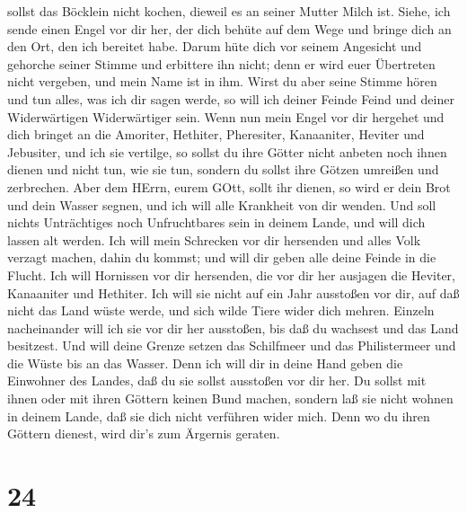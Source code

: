 sollst das Böcklein nicht kochen, dieweil es an seiner Mutter Milch ist.
 Siehe, ich sende einen Engel vor dir her, der dich behüte
auf dem Wege und bringe dich an den Ort, den ich bereitet habe.
 Darum hüte dich vor seinem Angesicht und gehorche seiner
Stimme und erbittere ihn nicht; denn er wird euer Übertreten nicht
vergeben, und mein Name ist in ihm.  Wirst du aber seine
Stimme hören und tun alles, was ich dir sagen werde, so will ich deiner
Feinde Feind und deiner Widerwärtigen Widerwärtiger sein. 
Wenn nun mein Engel vor dir hergehet und dich bringet an die Amoriter,
Hethiter, Pheresiter, Kanaaniter, Heviter und Jebusiter, und ich sie
vertilge,  so sollst du ihre Götter nicht anbeten noch
ihnen dienen und nicht tun, wie sie tun, sondern du sollst ihre Götzen
umreißen und zerbrechen.  Aber dem HErrn, eurem GOtt, sollt
ihr dienen, so wird er dein Brot und dein Wasser segnen, und ich will
alle Krankheit von dir wenden.  Und soll nichts
Unträchtiges noch Unfruchtbares sein in deinem Lande, und will dich
lassen alt werden.  Ich will mein Schrecken vor dir
hersenden und alles Volk verzagt machen, dahin du kommst; und will dir
geben alle deine Feinde in die Flucht.  Ich will Hornissen
vor dir hersenden, die vor dir her ausjagen die Heviter, Kanaaniter und
Hethiter.  Ich will sie nicht auf ein Jahr ausstoßen vor
dir, auf daß nicht das Land wüste werde, und sich wilde Tiere wider dich
mehren.  Einzeln nacheinander will ich sie vor dir her
ausstoßen, bis daß du wachsest und das Land besitzest.  Und
will deine Grenze setzen das Schilfmeer und das Philistermeer und die
Wüste bis an das Wasser. Denn ich will dir in deine Hand geben die
Einwohner des Landes, daß du sie sollst ausstoßen vor dir her.
 Du sollst mit ihnen oder mit ihren Göttern keinen Bund
machen,  sondern laß sie nicht wohnen in deinem Lande, daß
sie dich nicht verführen wider mich. Denn wo du ihren Göttern dienest,
wird dir's zum Ärgernis geraten.

\hypertarget{section-23}{%
\section{24}\label{section-23}}

